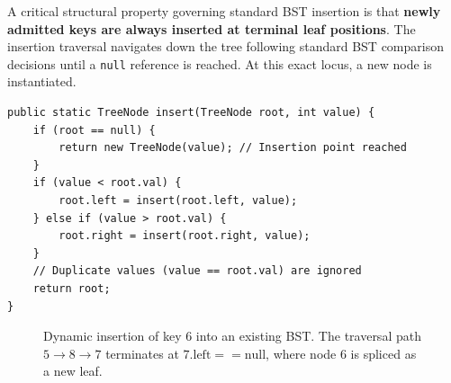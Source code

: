 \documentclass[10pt,journal,compsoc,onecolumn]{IEEEtran}
\begin{document}
A critical structural property governing standard BST insertion is that \textbf{newly admitted keys are always inserted at terminal leaf positions}. The insertion traversal navigates down the tree following standard BST comparison decisions until a \texttt{null} reference is reached. At this exact locus, a new node is instantiated.

\begin{verbatim}
public static TreeNode insert(TreeNode root, int value) {
    if (root == null) {
        return new TreeNode(value); // Insertion point reached
    }
    if (value < root.val) {
        root.left = insert(root.left, value);
    } else if (value > root.val) {
        root.right = insert(root.right, value);
    }
    // Duplicate values (value == root.val) are ignored
    return root;
}
\end{verbatim}

\begin{figure}[htbp]
\centering
{}
\caption{Dynamic insertion of key 6 into an existing BST. The traversal path $5 \to 8 \to 7$ terminates at $7.\mathrm{left} == \mathrm{null}$, where node 6 is spliced as a new leaf.}
\label{fig:bst_insertion}
\end{figure}
\end{document}
